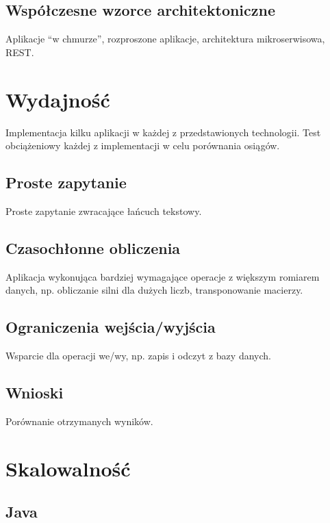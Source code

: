 \subsection{Współczesne wzorce
architektoniczne}\label{wspuxf3ux142czesne-wzorce-architektoniczne}

Aplikacje ``w chmurze'', rozproszone aplikacje, architektura
mikroserwisowa, REST.

\section{Wydajność}\label{wydajnoux15bux107}

Implementacja kilku aplikacji w każdej z przedstawionych technologii.
Test obciążeniowy każdej z implementacji w celu porównania osiągów.

\subsection{Proste zapytanie}\label{proste-zapytanie}

Proste zapytanie zwracające łańcuch tekstowy.

\subsection{Czasochłonne obliczenia}\label{czasochux142onne-obliczenia}

Aplikacja wykonująca bardziej wymagające operacje z większym romiarem
danych, np. obliczanie silni dla dużych liczb, transponowanie macierzy.

\subsection{Ograniczenia
wejścia/wyjścia}\label{ograniczenia-wejux15bciawyjux15bcia}

Wsparcie dla operacji we/wy, np. zapis i odczyt z bazy danych.

\subsection{Wnioski}\label{wnioski}

Porównanie otrzymanych wyników.

\section{Skalowalność}\label{skalowalnoux15bux107}

\subsection{Java}\label{java-2}

